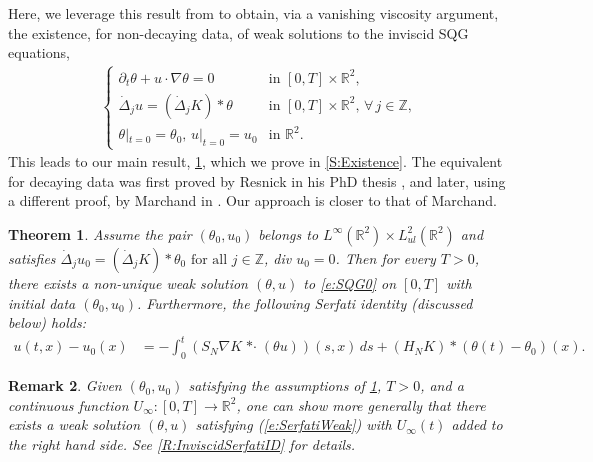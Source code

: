 \documentclass[11pt,reqno,xcolor=svgnames]{amsart}
\def\R{{\mathbb R}}
\def\Z{{\mathbb Z}}
\theoremstyle{plain}
\newtheorem{theorem}{Theorem}[section]
\theoremstyle{definition}
\theoremstyle{plain}
\newtheorem{remark}[theorem]{Remark}
\theoremstyle{remark}
\newcommand{\grad}{\ensuremath{\nabla}}
\newcommand{\prt}{\ensuremath{\partial}}
\newcommand{\stardot}{{\mathop{* \cdot}}}
\newcommand{\Del}{\dot{\Delta}}
\begin{document}
    Here, we leverage this result from \cite{AACK25} to obtain, via a vanishing viscosity argument, the existence, for non-decaying data, of weak solutions to the inviscid SQG equations,
    \begin{align}\label{e:SQG0}
        \tag{$SQG_0$}
        \begin{cases}
            \prt_t \theta + u\cdot\grad\theta = 0
                &\text{in }[0,T] \times \R^2,\\
            \Del_j u = (\Del_j K) *\theta
                &\text{in } [0,T]\times \R^2, \, \forall\,j\in\Z,\\
            \theta|_{t = 0} = \theta_0, \, u|_{t = 0} = u_0
                &\text{in }\R^2.
        \end{cases}
    \end{align}
    This leads to our main result, \cref{T:MainResult}, which we prove in \cref{S:Existence}. The equivalent for decaying data was first proved by Resnick in his PhD thesis \cite{Resnick}, and later, using a different proof, by Marchand in \cite{Marchand}. Our approach is closer to that of Marchand.

    \begin{theorem}\label{T:MainResult}
    Assume the pair $( \theta_0,u_0)$ belongs to $ L^{\infty}(\R^2)\times L^2_{ul}(\R^2)$ and satisfies $\dot{\Delta}_j u_0 = (\dot{\Delta}_jK)\ast \theta_0 \text{ for all }j\in\Z$, div $u_0=0$.  Then for every $T>0$, there exists a non-unique weak solution $(\theta,u)$ to \cref{e:SQG0} on $[0,T]$ with initial data $( \theta_0,u_0)$. %
    Furthermore, the following Serfati identity (discussed below) holds:
    \begin{equation}\label{e:SerfatiWeak}
        \begin{split}
            u(t, x) - u_0(x) 
                &= -\int_0^t \left(S_{N} \nabla K \stardot (\theta u) \right)(s,x) \, ds
                + (H_NK) \ast (\theta(t) - \theta_0)(x).
        \end{split}
    \end{equation}
    \end{theorem}
\begin{remark}
Given $(\theta_0,u_0)$ satisfying the assumptions of \cref{T:MainResult}, $T>0$, and a continuous function $U_{\infty}:[0,T]\rightarrow \R^2$, one can show more generally that there exists a weak solution $(\theta,u)$ satisfying (\ref{e:SerfatiWeak}) with $U_{\infty}(t)$ added to the right hand side.  See \cref{R:InviscidSerfatiID} for details.   
\end{remark}
 
\end{document}
